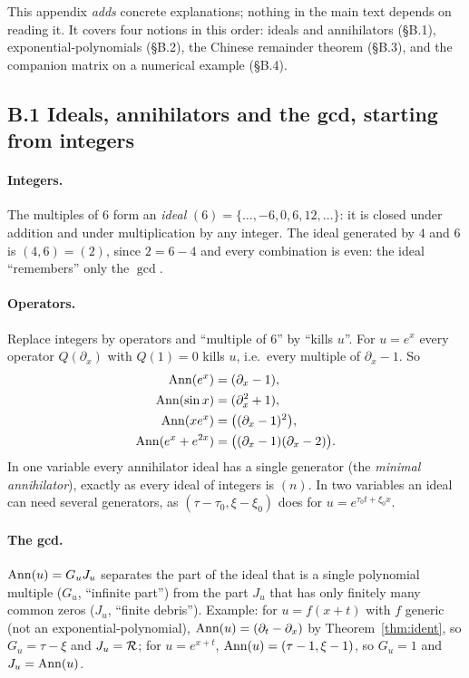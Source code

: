 This appendix \emph{adds} concrete explanations; nothing in the main text depends on reading it. It covers four notions in this order: ideals and annihilators (\S B.1), exponential-polynomials (\S B.2), the Chinese remainder theorem (\S B.3), and the companion matrix on a numerical example (\S B.4).

\subsection*{B.1 Ideals, annihilators and the gcd, starting from integers}
\paragraph{Integers.} The multiples of $6$ form an \emph{ideal} $(6)=\{\dots,-6,0,6,12,\dots\}$: it is closed under addition and under multiplication by any integer. The ideal generated by $4$ and $6$ is $(4,6)=(2)$, since $2=6-4$ and every combination is even: the ideal ``remembers'' only the $\gcd$.

\paragraph{Operators.} Replace integers by operators and ``multiple of $6$'' by ``kills $u$''. For $u=e^{x}$ every operator $Q(\partial_x)$ with $Q(1)=0$ kills $u$, i.e.\ every multiple of $\partial_x-1$. So
\[
\begin{aligned}
\operatorname{Ann}(e^x)&=(\partial_x-1),\\
\operatorname{Ann}(\sin x)&=(\partial_x^2+1),\\
\operatorname{Ann}(xe^x)&=\big((\partial_x-1)^2\big),\\
\operatorname{Ann}(e^x+e^{2x})&=\big((\partial_x-1)(\partial_x-2)\big).
\end{aligned}
\]
In one variable every annihilator ideal has a single generator (the \emph{minimal annihilator}), exactly as every ideal of integers is $(n)$. In two variables an ideal can need several generators, as $(\tau-\tau_0,\xi-\xi_0)$ does for $u=e^{\tau_0t+\xi_0x}$.

\paragraph{The gcd.} $\operatorname{Ann}(u)=G_uJ_u$ separates the part of the ideal that is a single polynomial multiple ($G_u$, ``infinite part'') from the part $J_u$ that has only finitely many common zeros ($J_u$, ``finite debris''). Example: for $u=f(x+t)$ with $f$ generic (not an exponential-polynomial), $\operatorname{Ann}(u)=(\partial_t-\partial_x)$ by Theorem~\ref{thm:ident}, so $G_u=\tau-\xi$ and $J_u=\mathcal{R}$; for $u=e^{x+t}$, $\operatorname{Ann}(u)=(\tau-1,\xi-1)$, so $G_u=1$ and $J_u=\operatorname{Ann}(u)$.

